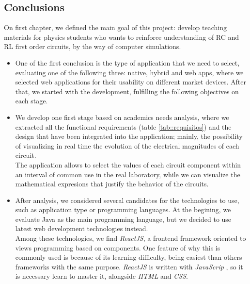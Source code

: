 \documentclass[../main.tex]{subfiles}
\begin{document}
\subsection{Conclusions}

On first chapter, we defined the main goal of this project: develop teaching materials for physics students who wants to reinforce understanding of RC and RL first order circuits, by the way of computer simulations.\\ 




\begin{itemize}
    
    \item One of the first conclusion is the type of application that we need to select, evaluating one of the following three: native, hybrid and web apps, where we selected web applications for their usability on different market devices. After that, we started with the development, fulfilling the following objectives on each stage.
    
    \item We develop one first stage based on academics needs analysis, where we extracted all the functional requirements (table \ref{tab::requisitos}) and the design that have been integrated into the application;  mainly, the possibility of visualizing in real time the evolution of the electrical magnitudes of each circuit.\\
    
    The application allows to select the values of each circuit component within an interval of common use in the real laboratory, while we can visualize the mathematical expresions that justify the behavior of the circuits.

    \item After analysis, we considered several candidates for the technologies to use, such as application type or programming languages. At the begining, we evaluate Java as the main programming language, but we decided to use latest web development technologies instead.\\
    
    
    Among these technologies, we find \textit{ReactJS}, a frontend framework oriented to views programming based on components. One feature of why this is commonly used is because of its learning difficulty, being easiest than others frameworks with the same purpose. \textit{ReactJS} is written with \textit{JavaScrip
    }, so it is necessary learn to master it, alongside \textit{HTML} and \textit{CSS}. 
    

\end{itemize}
\end{document}

